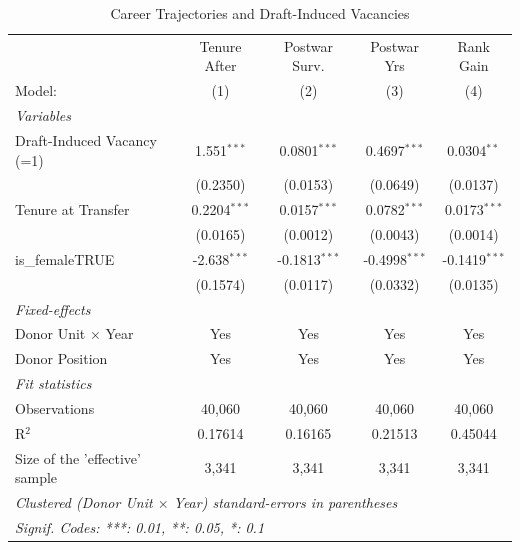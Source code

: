 \begin{table}[htbp]
\centering
\caption{Career Trajectories and Draft-Induced Vacancies}
\label{tab:career-draft-vacancy}
\begin{threeparttable}

\begin{tabular}{lcccc}
   \tabularnewline \midrule \midrule
                                  & Tenure After   & Postwar Surv.      & Postwar Yrs     & Rank Gain \\   
   Model:                         & (1)            & (2)                & (3)             & (4)\\  
   \midrule
   \emph{Variables}\\
   Draft-Induced Vacancy (=1)     & 1.551$^{***}$  & 0.0801$^{***}$     & 0.4697$^{***}$  & 0.0304$^{**}$\\   
                                  & (0.2350)       & (0.0153)           & (0.0649)        & (0.0137)\\   
   Tenure at Transfer             & 0.2204$^{***}$ & 0.0157$^{***}$     & 0.0782$^{***}$  & 0.0173$^{***}$\\   
                                  & (0.0165)       & (0.0012)           & (0.0043)        & (0.0014)\\   
   is\_femaleTRUE                 & -2.638$^{***}$ & -0.1813$^{***}$    & -0.4998$^{***}$ & -0.1419$^{***}$\\   
                                  & (0.1574)       & (0.0117)           & (0.0332)        & (0.0135)\\   
   \midrule
   \emph{Fixed-effects}\\
   Donor Unit $\times$ Year       & Yes            & Yes                & Yes             & Yes\\  
   Donor Position                 & Yes            & Yes                & Yes             & Yes\\  
   \midrule
   \emph{Fit statistics}\\
   Observations                   & 40,060         & 40,060             & 40,060          & 40,060\\  
   R$^2$                          & 0.17614        & 0.16165            & 0.21513         & 0.45044\\  
   Size of the 'effective' sample & 3,341          & 3,341              & 3,341           & 3,341\\  
   \midrule \midrule
   \multicolumn{5}{l}{\emph{Clustered (Donor Unit $\times$ Year) standard-errors in parentheses}}\\
   \multicolumn{5}{l}{\emph{Signif. Codes: ***: 0.01, **: 0.05, *: 0.1}}\\
\end{tabular}


\end{threeparttable}
\end{table}
